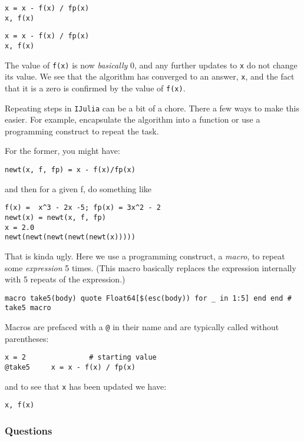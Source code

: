 \documentclass[12pt]{article}
\begin{document}
\begin{verbatim}
x = x - f(x) / fp(x)
x, f(x)
\end{verbatim}


\begin{verbatim}
x = x - f(x) / fp(x)
x, f(x)
\end{verbatim}
The value of \texttt{f(x)} is now \emph{basically} 0, and any further
updates to \texttt{x} do not change its value. We see that the algorithm
has converged to an answer, \texttt{x}, and the fact that it is a zero
is confirmed by the value of \texttt{f(x)}.

Repeating steps in \texttt{IJulia} can be a bit of a chore. There a few
ways to make this easier. For example, encapsulate the algorithm into a
function or use a programming construct to repeat the task.

For the former, you might have:



\begin{verbatim}
newt(x, f, fp) = x - f(x)/fp(x)
\end{verbatim}
and then for a given f, do something like



\begin{verbatim}
f(x) =  x^3 - 2x -5; fp(x) = 3x^2 - 2
newt(x) = newt(x, f, fp)
x = 2.0
newt(newt(newt(newt(newt(x)))))
\end{verbatim}
That is kinda ugly. Here we use a programming construct, a \emph{macro},
to repeat some \emph{expression} 5 times. (This macro basically replaces
the expression internally with 5 repeats of the expression.)



\begin{verbatim}
macro take5(body) quote Float64[$(esc(body)) for _ in 1:5] end end # take5 macro
\end{verbatim}
Macros are prefaced with a \texttt{@} in their name and are typically
called without parentheses:



\begin{verbatim}
x = 2               # starting value
@take5     x = x - f(x) / fp(x)
\end{verbatim}
and to see that \texttt{x} has been updated we have:



\begin{verbatim}
x, f(x)
\end{verbatim}
\subsubsection{Questions}
\end{document}
